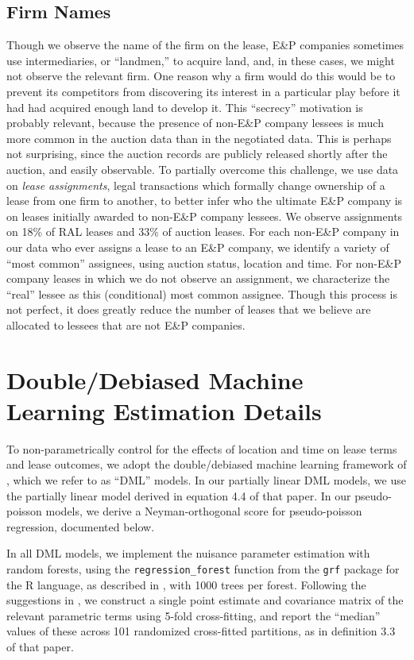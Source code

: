 \documentclass[12pt]{article}
\begin{document}
\begin{appendices}
\subsection{Firm Names \label{sec:FirmNameCleaning}}
Though we observe the name of the firm on the lease, E\&P companies sometimes use intermediaries, or ``landmen,'' to acquire land, and, in these cases, we might not observe the relevant firm. One reason why a firm would do this would be to prevent its competitors from discovering its interest in a particular play before it had had acquired enough land to develop it. This ``secrecy'' motivation is probably relevant, because the presence of non-E\&P company lessees is much more common in the auction data than in the negotiated data. This is perhaps not surprising, since the auction records are publicly released shortly after the auction, and easily observable.  To partially overcome this challenge, we use data on \textit{lease assignments}, legal transactions which formally change ownership of a lease from one firm to another, to better infer who the ultimate E\&P company is on leases initially awarded to non-E\&P company lessees. We observe assignments on 18\% of RAL leases and 33\% of auction leases. For each non-E\&P company in our data who ever assigns a lease to an E\&P company, we identify a variety of ``most common'' assignees, using auction status, location and time.  For non-E\&P company leases in which we do not observe an assignment, we characterize the ``real'' lessee as this (conditional) most common assignee.  Though this process is not perfect, it does greatly reduce the number of leases that we believe are allocated to lessees that are not E\&P companies.

\pagebreak

\section{Double/Debiased Machine Learning Estimation Details}\label{sec:dml}

To non-parametrically control for the effects of location and time on lease terms and lease outcomes, we adopt the double/debiased machine learning framework of \cite{chernozhukov2018double}, which we refer to as ``DML'' models.  In our partially linear DML models, we use the partially linear model derived in equation 4.4 of that paper.  In our pseudo-poisson models, we derive a Neyman-orthogonal score for pseudo-poisson regression, documented below.  

In all DML models, we implement the nuisance parameter estimation with random forests, using the \texttt{regression\_forest} function from the \texttt{grf} package for the R language, as described in \cite{athey2019generalized}, with 1000 trees per forest.  Following the suggestions in \cite{chernozhukov2018double}, we construct a single point estimate and covariance matrix of the relevant parametric terms using 5-fold cross-fitting, and report the ``median'' values of these across 101 randomized cross-fitted partitions, as in definition 3.3 of that paper. 


\end{appendices}
\end{document}
